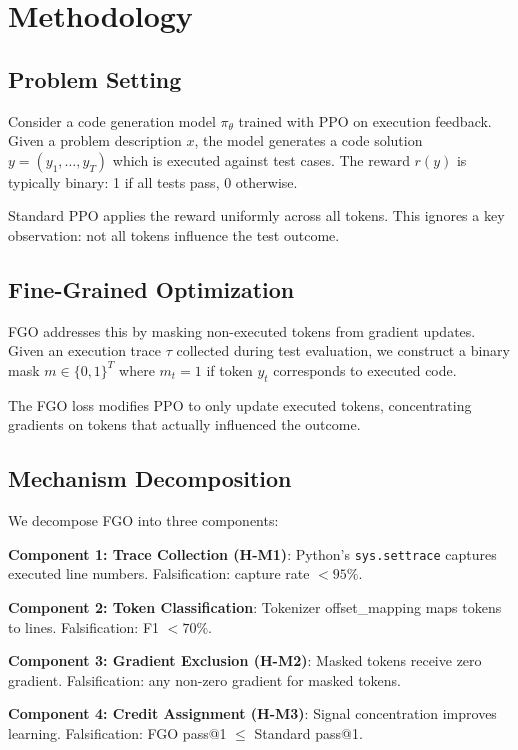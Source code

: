 \section{Methodology}

\subsection{Problem Setting}

Consider a code generation model $\pi_\theta$ trained with PPO on execution feedback. Given a problem description $x$, the model generates a code solution $y = (y_1, \ldots, y_T)$ which is executed against test cases. The reward $r(y)$ is typically binary: 1 if all tests pass, 0 otherwise.

Standard PPO applies the reward uniformly across all tokens. This ignores a key observation: not all tokens influence the test outcome.

\subsection{Fine-Grained Optimization}

FGO addresses this by masking non-executed tokens from gradient updates. Given an execution trace $\tau$ collected during test evaluation, we construct a binary mask $m \in \{0, 1\}^T$ where $m_t = 1$ if token $y_t$ corresponds to executed code.

The FGO loss modifies PPO to only update executed tokens, concentrating gradients on tokens that actually influenced the outcome.

\subsection{Mechanism Decomposition}

We decompose FGO into three components:

\textbf{Component 1: Trace Collection (H-M1)}: Python's \texttt{sys.settrace} captures executed line numbers. Falsification: capture rate $< 95\%$.

\textbf{Component 2: Token Classification}: Tokenizer offset\_mapping maps tokens to lines. Falsification: F1 $< 70\%$.

\textbf{Component 3: Gradient Exclusion (H-M2)}: Masked tokens receive zero gradient. Falsification: any non-zero gradient for masked tokens.

\textbf{Component 4: Credit Assignment (H-M3)}: Signal concentration improves learning. Falsification: FGO pass@1 $\leq$ Standard pass@1.

